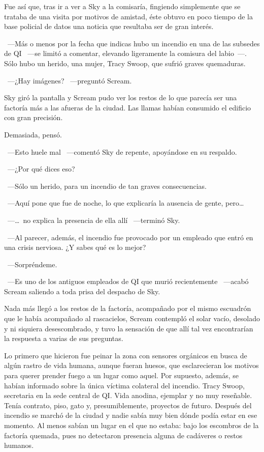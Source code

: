 Fue así que, tras ir a ver a Sky a la comisaría, fingiendo simplemente que se trataba de una visita por motivos de amistad, éste obtuvo en poco tiempo de la base policial de datos una noticia que resultaba ser de gran interés.

~---Más o menos por la fecha que indicas hubo un incendio en una de las subsedes de QI ~---se limitó a comentar, elevando ligeramente la comisura del labio~---. Sólo hubo un herido, una mujer, Tracy Swoop, que sufrió graves quemaduras.

~---¿Hay imágenes? ~---preguntó Scream.

Sky giró la pantalla y Scream pudo ver los restos de lo que parecía ser una factoría más a las afueras de la ciudad. Las llamas habían consumido el edificio con gran precisión.

Demasiada, pensó.

~---Esto huele mal ~---comentó Sky de repente, apoyándose en su respaldo.

~---¿Por qué dices eso?

~---Sólo un herido, para un incendio de tan graves consecuencias.

~---Aquí pone que fue de noche, lo que explicaría la ausencia de gente, pero\dots

~---\dots\ no explica la presencia de ella allí ~---terminó Sky.

~---Al parecer, además, el incendio fue provocado por un empleado que entró en una crisis nerviosa. ¿Y sabes qué es lo mejor?

~---Sorpréndeme.

~---Es uno de los antiguos empleados de QI que murió recientemente ~---acabó Scream saliendo a toda prisa del despacho de Sky.

\parbreak
Nada más llegó a los restos de la factoría, acompañado por el mismo escuadrón que le había acompañado al rascacielos, Scream contempló el solar vacío, desolado y ni siquiera desescombrado, y tuvo la sensación de que allí tal vez encontrarían la respuesta a varias de sus preguntas.

Lo primero que hicieron fue peinar la zona con sensores orgánicos en busca de algún rastro de vida humana, aunque fueran huesos, que esclarecieran los motivos para querer prender fuego a un lugar como aquel. Por supuesto, además, se habían informado sobre la única víctima colateral del incendio. Tracy Swoop, secretaria en la sede central de QI. Vida anodina, ejemplar y no muy reseñable. Tenía contrato, piso, gato y, presumiblemente, proyectos de futuro. Después del incendio se marchó de la ciudad y nadie sabía muy bien dónde podía estar en ese momento. Al menos sabían un lugar en el que no estaba: bajo los escombros de la factoría quemada, pues no detectaron presencia alguna de cadáveres o restos humanos.

